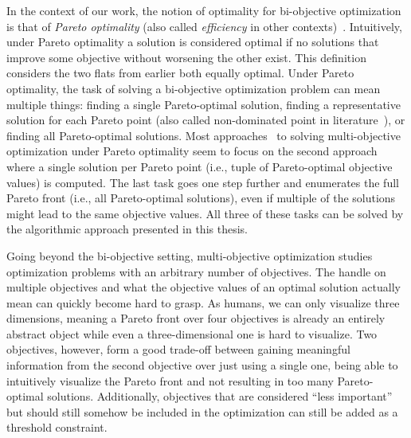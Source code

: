 In the context of our work, the notion of optimality for bi-objective optimization is that of \emph{Pareto optimality} (also called \emph{efficiency} in other contexts)~\autocite{Ehrgott2005-2}.
Intuitively, under Pareto optimality a solution is considered optimal if no solutions that improve some objective without worsening the other exist.
This definition considers the two flats from earlier both equally optimal.
Under Pareto optimality, the task of solving a bi-objective optimization problem can mean multiple things:
finding a single Pareto-optimal solution, finding a representative solution for each Pareto point (also called non-dominated point in literature~\autocite{Ehrgott2005-2}), or finding all Pareto-optimal solutions.
Most approaches~\autocite{DBLP:conf/cp/SohBTB17,DBLP:conf/cp/JanotaMSM21,DBLP:conf/ijcai/Terra-NevesLM18a} to solving multi-objective optimization under Pareto optimality seem to focus on the second approach where a single solution per Pareto point (i.e., tuple of Pareto-optimal objective values) is computed.
The last task goes one step further and enumerates the full Pareto front (i.e., all Pareto-optimal solutions), even if multiple of the solutions might lead to the same objective values.
All three of these tasks can be solved by the algorithmic approach presented in this thesis.

Going beyond the bi-objective setting, multi-objective optimization studies optimization problems with an arbitrary number of objectives.
The handle on multiple objectives and what the objective values of an optimal solution actually mean can quickly become hard to grasp.
As humans, we can only visualize three dimensions, meaning a Pareto front over four objectives is already an entirely abstract object while even a three-dimensional one is hard to visualize.
Two objectives, however, form a good trade-off between gaining meaningful information from the second objective over just using a single one, being able to intuitively visualize the Pareto front and not resulting in too many Pareto-optimal solutions.
Additionally, objectives that are considered ``less important'' but should still somehow be included in the optimization can still be added as a threshold constraint.

